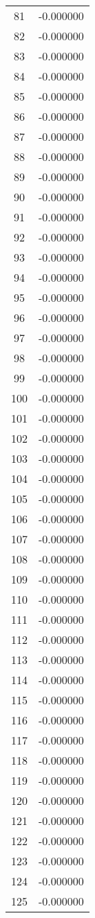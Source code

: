 \documentclass[12pt]{article}
\begin{document}
\begin{longtable}{@{}cc@{}}
81 & -0.000000 \\
82 & -0.000000 \\
83 & -0.000000 \\
84 & -0.000000 \\
85 & -0.000000 \\
86 & -0.000000 \\
87 & -0.000000 \\
88 & -0.000000 \\
89 & -0.000000 \\
90 & -0.000000 \\
91 & -0.000000 \\
92 & -0.000000 \\
93 & -0.000000 \\
94 & -0.000000 \\
95 & -0.000000 \\
96 & -0.000000 \\
97 & -0.000000 \\
98 & -0.000000 \\
99 & -0.000000 \\
100 & -0.000000 \\
101 & -0.000000 \\
102 & -0.000000 \\
103 & -0.000000 \\
104 & -0.000000 \\
105 & -0.000000 \\
106 & -0.000000 \\
107 & -0.000000 \\
108 & -0.000000 \\
109 & -0.000000 \\
110 & -0.000000 \\
111 & -0.000000 \\
112 & -0.000000 \\
113 & -0.000000 \\
114 & -0.000000 \\
115 & -0.000000 \\
116 & -0.000000 \\
117 & -0.000000 \\
118 & -0.000000 \\
119 & -0.000000 \\
120 & -0.000000 \\
121 & -0.000000 \\
122 & -0.000000 \\
123 & -0.000000 \\
124 & -0.000000 \\
125 & -0.000000 \\

\end{longtable}
\end{document}

